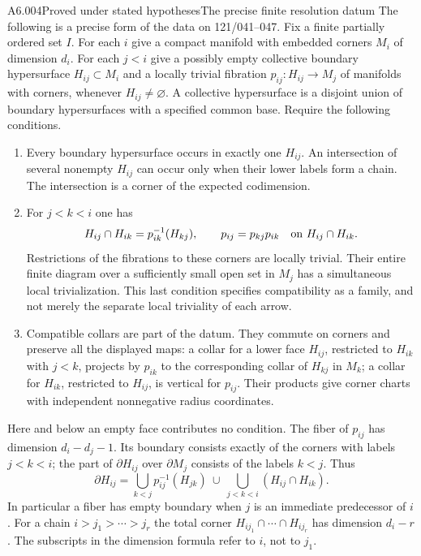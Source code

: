 \begin{saresult}{A6.004}{Proved under stated hypotheses}{The precise finite resolution datum}
The following is a precise form of the data on 121/041--047.
Fix a finite partially ordered set $I$. For each $i$ give a compact
manifold with embedded corners $M_i$ of dimension $d_i$. For each
$j<i$ give a possibly empty collective boundary hypersurface
$H_{ij}\subset M_i$ and a locally trivial fibration
$p_{ij}:H_{ij}\to M_j$ of manifolds with corners, whenever
$H_{ij}\ne\varnothing$. A collective hypersurface is a disjoint
union of boundary hypersurfaces with a specified common base.
Require the following conditions.
\begin{enumerate}
\item Every boundary hypersurface occurs in exactly one $H_{ij}$.
An intersection of several nonempty $H_{ij}$ can occur only when
their lower labels form a chain. The intersection is a corner of
the expected codimension.
\item For $j<k<i$ one has
\[
H_{ij}\cap H_{ik}=p_{ik}^{-1}(H_{kj}),\qquad
p_{ij}=p_{kj}p_{ik}\quad\hbox{on }H_{ij}\cap H_{ik}.
\]
Restrictions of the fibrations to these corners are locally trivial.
Their entire finite diagram over a sufficiently small open set in
$M_j$ has a simultaneous local trivialization. This last condition
specifies compatibility as a family, and not merely the separate
local triviality of each arrow.
\item Compatible collars are part of the datum. They commute on
corners and preserve all the displayed maps: a collar for a lower
face $H_{ij}$, restricted to $H_{ik}$ with $j<k$, projects by
$p_{ik}$ to the corresponding collar of $H_{kj}$ in $M_k$;
a collar for $H_{ik}$, restricted to $H_{ij}$, is vertical for
$p_{ij}$. Their products give corner charts with independent
nonnegative radius coordinates.
\end{enumerate}
Here and below an empty face contributes no condition. The fiber of
$p_{ij}$ has dimension $d_i-d_j-1$. Its boundary consists exactly of
the corners with labels $j<k<i$; the part of $\partial H_{ij}$ over
$\partial M_j$ consists of the labels $k<j$. Thus
\[
\partial H_{ij}=
\bigcup_{k<j}p_{ij}^{-1}(H_{jk})
\ \cup\ \bigcup_{j<k<i}(H_{ij}\cap H_{ik}).
\]
In particular a fiber has empty boundary when $j$ is an immediate
predecessor of $i$. For a chain $i>j_1>\cdots>j_r$ the total corner
$H_{ij_1}\cap\cdots\cap H_{ij_r}$ has dimension $d_i-r$.
The subscripts in the dimension formula refer to $i$, not to $j_1$.
\end{saresult}

